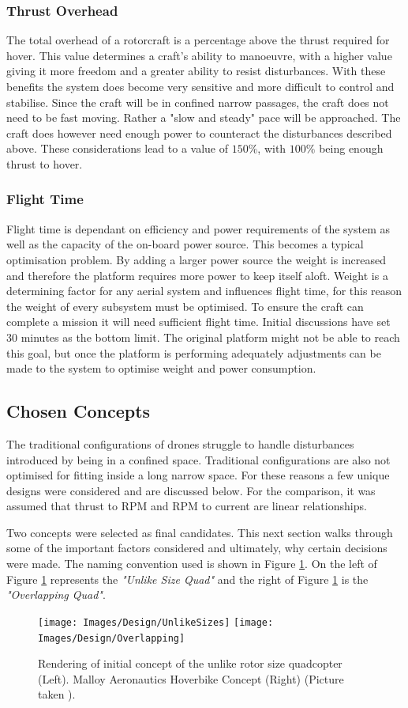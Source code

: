 			\subsubsection{Thrust Overhead}
			The total overhead of a rotorcraft is a percentage above the thrust required for hover. This value determines a craft's ability to manoeuvre, with a higher value giving it more freedom and a greater ability to resist disturbances. With these benefits the system does become very sensitive and more difficult to control and stabilise. Since the craft will be in confined narrow passages, the craft does not need to be fast moving. Rather a "slow and steady" pace will be approached. The craft does however need enough power to counteract the disturbances described above. These considerations lead to a value of $150\%$, with $100\%$ being enough thrust to hover.
			
			\subsubsection{Flight Time}
			Flight time is dependant on efficiency and power requirements of the system as well as the capacity of the on-board power source. This becomes a typical optimisation problem. By adding a larger power source the weight is increased and therefore the platform requires more power to keep itself aloft. Weight is a determining factor for any aerial system and influences flight time, for this reason the weight of every subsystem must be optimised. To ensure the craft can complete a mission it will need sufficient flight time. Initial discussions have set 30 minutes as the bottom limit. The original platform might not be able to reach this goal, but once the platform is performing adequately adjustments can be made to the system to optimise weight and power consumption. 
			
		\subsection{Chosen Concepts}
		The traditional configurations of drones struggle to handle disturbances introduced by being in a confined space. Traditional configurations are also not optimised for fitting inside a long narrow space. For these reasons a few unique designs were considered and are discussed below.
		For the comparison, it was assumed that thrust to RPM and RPM to current are linear relationships.
		
		Two concepts were selected as final candidates. This next section walks through some of the important factors considered and ultimately, why certain decisions were made. The naming convention used is shown in Figure \ref{IM_UnlikeSizes}.
		On the left of Figure \ref{IM_UnlikeSizes} represents the \textit{"Unlike Size Quad"} and the right of Figure \ref{IM_UnlikeSizes} is the \textit{"Overlapping Quad"}. 
		\begin{figure}[H]
		\centering
		\texttt{[image: Images/Design/UnlikeSizes]}
		\texttt{[image: Images/Design/Overlapping]}
		\caption{Rendering of initial concept of the unlike rotor size quadcopter (Left). Malloy Aeronautics Hoverbike Concept (Right) (Picture taken \cite{MAHover}).}
		\label{IM_UnlikeSizes}
		\end{figure}
			

